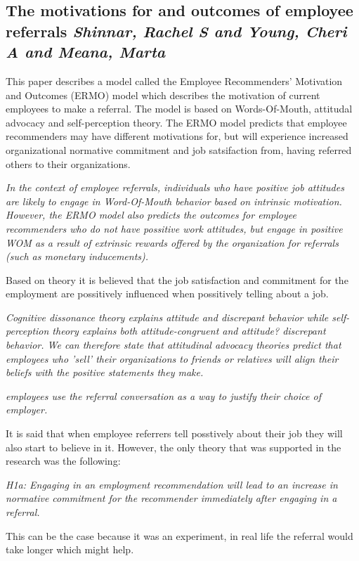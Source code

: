 \documentclass[a4paper, 11pt]{article} %
\begin{document}
\subsection*{The motivations for and outcomes of employee referrals  \emph{Shinnar, Rachel S and Young, Cheri A and Meana, Marta} \cite{ninth}}

This paper describes a model called the Employee Recommenders' Motivation and Outcomes (ERMO) model which describes the motivation of current employees to make a referral. The model is based on Words-Of-Mouth, attitudal advocacy and self-perception theory. The ERMO model predicts that employee recommenders may have different motivations for, but will experience increased organizational normative commitment and job satsifaction from, having referred others to their organizations.

\emph{In the context of employee referrals, individuals who have positive job attitudes are likely to engage in Word-Of-Mouth
behavior based on intrinsic motivation. However, the ERMO model also
predicts the outcomes for employee recommenders who do not have possitive work attitudes, but engage in positive WOM as a result of extrinsic
rewards offered by the organization for referrals (such as monetary
inducements).}

Based on theory it is believed that the job satisfaction and commitment for the employment are possitively influenced when possitively telling about a job. 

\emph{Cognitive dissonance theory explains attitude and discrepant behavior while self-perception theory explains
both attitude-congruent and attitude? discrepant behavior. We can
therefore state that attitudinal advocacy theories predict that employees
who 'sell' their organizations to friends or relatives will align their beliefs
with the positive statements they make. }

\emph{employees use the referral
conversation as a way to justify their choice of employer.}

It is said that when employee referrers tell posstively about their job they will also start to believe in it.
However, the only theory that was supported in the research was the following:

\emph{H1a: Engaging in an employment recommendation will lead to an
increase in normative commitment for the recommender immediately after engaging in a referral. }

This can be the case because it was an experiment, in real life the referral would take longer which might help.





\end{document}
